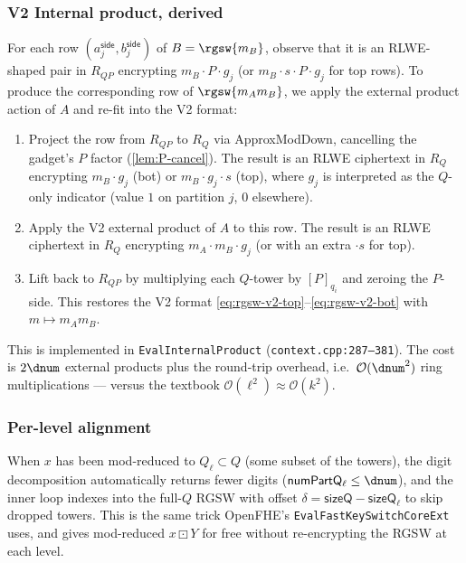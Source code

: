 \subsubsection{V2 Internal product, derived}
\label{sec:rgsw:v2-intprod}

For each row $(a_j^{\mathsf{side}}, b_j^{\mathsf{side}})$ of $B = \rgsw{m_B}$, observe that it is an RLWE-shaped pair in $R_{QP}$ encrypting $m_B \cdot P \cdot g_j$ (or $m_B \cdot s \cdot P \cdot g_j$ for top rows). To produce the corresponding row of $\rgsw{m_A m_B}$, we apply the external product action of $A$ and re-fit into the V2 format:

\begin{enumerate}
    \item Project the row from $R_{QP}$ to $R_Q$ via \textsf{ApproxModDown}, cancelling the gadget's $P$ factor (\autoref{lem:P-cancel}). The result is an RLWE ciphertext in $R_Q$ encrypting $m_B \cdot g_j$ (bot) or $m_B \cdot g_j \cdot s$ (top), where $g_j$ is interpreted as the $Q$-only indicator (value $1$ on partition $j$, $0$ elsewhere).
    \item Apply the V2 external product of $A$ to this row. The result is an RLWE ciphertext in $R_Q$ encrypting $m_A \cdot m_B \cdot g_j$ (or with an extra $\cdot s$ for top).
    \item Lift back to $R_{QP}$ by multiplying each $Q$-tower by $[P]_{q_i}$ and zeroing the $P$-side. This restores the V2 format \eqref{eq:rgsw-v2-top}--\eqref{eq:rgsw-v2-bot} with $m \mapsto m_A m_B$.
\end{enumerate}

This is implemented in \texttt{EvalInternalProduct} (\texttt{context.cpp:287--381}). The cost is $2\dnum$ external products plus the round-trip overhead, i.e.\ $\mathcal{O}(\dnum^2)$ ring multiplications --- versus the textbook $\mathcal{O}(\ell^2) \approx \mathcal{O}(k^2)$.

\subsubsection{Per-level alignment}
\label{sec:rgsw:level-align}

When $x$ has been mod-reduced to $Q_\ell \subset Q$ (some subset of the towers), the digit decomposition automatically returns fewer digits ($\mathsf{numPartQ_\ell} \leq \dnum$), and the inner loop indexes into the full-$Q$ RGSW with offset $\delta = \mathsf{sizeQ} - \mathsf{sizeQ_\ell}$ to skip dropped towers. This is the same trick OpenFHE's \texttt{EvalFastKeySwitchCoreExt} uses, and gives mod-reduced $x \boxdot Y$ for free without re-encrypting the RGSW at each level.


